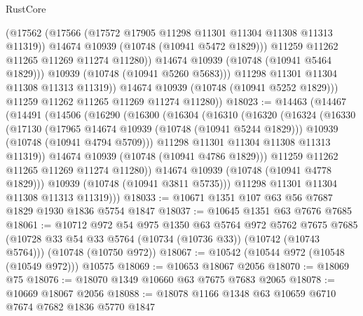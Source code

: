 \begin{lexlean}{RustCore}
\begin{coremodule}
                      (@17562
                        (@17566 (@17572 @17905 @11298 @11301 @11304 @11308 @11313 @11319))
                        @14674
                        @10939
                        (@10748 (@10941 @5472 @1829)))
                      @11259
                      @11262
                      @11265
                      @11269
                      @11274
                      @11280))
                  @14674
                  @10939
                  (@10748 (@10941 @5464 @1829)))
                @10939
                (@10748 (@10941 @5260 @5683)))
              @11298
              @11301
              @11304
              @11308
              @11313
              @11319))
          @14674
          @10939
          (@10748 (@10941 @5252 @1829)))
        @11259
        @11262
        @11265
        @11269
        @11274
        @11280))
@18023 := @14463
    (@14467
      (@14491
        (@14506
          (@16290
            (@16300
              (@16304
                (@16310
                  (@16320
                    (@16324
                      (@16330
                        (@17130
                          (@17965 @14674 @10939 (@10748 (@10941 @5244 @1829)))
                          @10939
                          (@10748 (@10941 @4794 @5709)))
                        @11298
                        @11301
                        @11304
                        @11308
                        @11313
                        @11319))
                    @14674
                    @10939
                    (@10748 (@10941 @4786 @1829)))
                  @11259
                  @11262
                  @11265
                  @11269
                  @11274
                  @11280))
              @14674
              @10939
              (@10748 (@10941 @4778 @1829)))
            @10939
            (@10748 (@10941 @3811 @5735)))
          @11298
          @11301
          @11304
          @11308
          @11313
          @11319)))
@18033 := @10671 @1351 @107 @63 @56 @7687 @1829 @1930 @1836 @5754 @1847
@18037 := @10645 @1351 @63 @7676 @7685
@18061 := @10712
    @972
    @54
    @975
    @1350
    @63
    @5764
    @972
    @5762
    @7675
    @7685
    (@10728 @33 @54 @33 @5764 (@10734 (@10736 @33)) (@10742 (@10743 @5764)))
    (@10748 (@10750 @972))
@18067 := @10542 (@10544 @972 (@10548 (@10549 @972))) @10575
@18069 := @10653 @18067 @2056
@18070 := @18069 @75
@18076 := @18070 @1349 @10660 @63 @7675 @7683 @2065
@18078 := @10669 @18067 @2056
@18088 := @18078 @1166 @1348 @63 @10659 @6710 @7674 @7682 @1836 @5770 @1847

\end{coremodule}
\end{lexlean}
